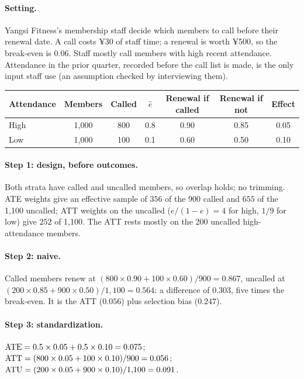 \documentclass[11pt]{article}
\begin{document}
\paragraph{Setting.} Yangsi Fitness's membership staff decide which members to call before their renewal date. A call costs ¥30 of staff
time; a renewal is worth ¥500, so the break-even is $0.06$. Staff mostly call members with high recent attendance. Attendance in
the prior quarter, recorded before the call list is made, is the only input staff use (an assumption checked by interviewing them).
\begin{center}
\begin{tabular}{lcccccc}
\toprule
Attendance & Members & Called & $\hat e$ & Renewal if called & Renewal if not & Effect \\
\midrule
High & 1{,}000 & 800 & 0.8 & 0.90 & 0.85 & 0.05 \\
Low  & 1{,}000 & 100 & 0.1 & 0.60 & 0.50 & 0.10 \\
\bottomrule
\end{tabular}
\end{center}

\paragraph{Step 1: design, before outcomes.} Both strata have called and uncalled members, so overlap holds; no trimming. ATE
weights give an effective sample of $356$ of the 900 called and $655$ of the 1{,}100 uncalled; ATT weights on the uncalled
($e/(1-e) = 4$ for high, $1/9$ for low) give $252$ of 1{,}100. The ATT rests mostly on the 200 uncalled high-attendance members.

\paragraph{Step 2: naive.} Called members renew at $(800 \times 0.90 + 100 \times 0.60)/900 = 0.867$, uncalled at
$(200 \times 0.85 + 900 \times 0.50)/1{,}100 = 0.564$: a difference of $0.303$, five times the break-even. It is the ATT ($0.056$) plus
selection bias ($0.247$).

\paragraph{Step 3: standardization.} $\text{ATE} = 0.5 \times 0.05 + 0.5 \times 0.10 = 0.075$;
$\text{ATT} = (800 \times 0.05 + 100 \times 0.10)/900 = 0.056$; $\text{ATU} = (200 \times 0.05 + 900 \times 0.10)/1{,}100 = 0.091$.
\end{document}
